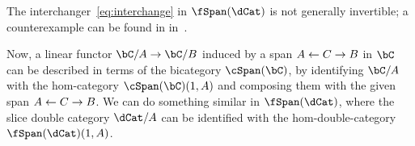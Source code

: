 \documentclass{amsart}
\begin{document}
The interchanger~\eqref{eq:interchange} in $\fSpan(\dCat)$ is not generally invertible; a counterexample can be found in in~\cite[6.5]{gp:intercategories-ii}.



Now, a linear functor $\bC/A\to \bC/B$ induced by a span $A \leftarrow C \to B$ in $\bC$ can be described in terms of the bicategory $\cSpan(\bC)$, by identifying $\bC/A$ with the hom-category $\cSpan(\bC)(1,A)$ and composing them with the given span $A \leftarrow C \to B$.
We can do something similar in $\fSpan(\dCat)$, where the slice double category $\dCat/A$ can be identified with the hom-double-category $\fSpan(\dCat)(1,A)$.
\end{document}
